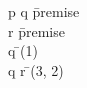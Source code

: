 \documentclass{article}
\begin{document}
\begin{proofbox}
\: p \land q \= \hbox{premise} \\
\: r \= \hbox{premise} \\
\: q \= \andelim(1) \\
\: q \land r \= \andintro(3, 2) \\
\end{proofbox}
\end{document}
